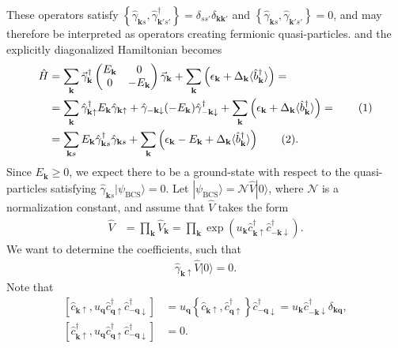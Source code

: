 \documentclass[english, parskip=full]{scrartcl}
\newcommand\numberthis{\addtocounter{equation}{1}\tag{\theequation}}
\newcommand{\kla}{}
\newcommand{\klam}{}
\newcommand{\klammer}{}
\newcommand{\tecxt}{}
\newcommand{\Ket}{}
\begin{document}
These operators satisfy $\klammer\left\{ \hat{\gamma}_{\mathbf{k}s}, \hat{\gamma}_{\mathbf{k}'s'}^\dagger \right\} = \delta_{ss'} \delta_{\mathbf{k}\mathbf{k}'}$ and $\klammer\left\{ \hat{\gamma}_{\mathbf{k}s}, \hat{\gamma}_{\mathbf{k}'s'} \right\} = 0$, and may therefore be interpreted as operators creating fermionic quasi-particles.
and the explicitly diagonalized Hamiltonian becomes
\begin{align}
\hat{H} &= \sum_{\mathbf{k}} \vec{\gamma}_{\mathbf{k}}^\dagger \begin{pmatrix}
E_{\mathbf{k}} & 0 \\ 0 & -E_{\mathbf{k}}
\end{pmatrix} \vec{\gamma}_{\mathbf{k}} + \sum_{\textbf{k}}\kla\left(  \epsilon_\textbf{k} + \Delta_\textbf{k} \langle \hat{b}_{\mathbf{k}}^\dagger \rangle \right) =  \\
&= \sum_{\mathbf{k}} \hat{\gamma}_{\mathbf{k}\uparrow}^\dagger E_{\mathbf{k}} \hat{\gamma}_{\mathbf{k}\uparrow} + \hat{\gamma}_{-\mathbf{k}\downarrow} (-E_{\mathbf{k}}) \hat{\gamma}_{-\mathbf{k}\downarrow}^\dagger + \sum_{\textbf{k}}\kla\left(  \epsilon_\textbf{k} + \Delta_\textbf{k} \langle \hat{b}_{\mathbf{k}}^\dagger \rangle \right) =  \numberthis\\
&= \sum_{\mathbf{k}s} E_{\mathbf{k}} \hat{\gamma}_{\mathbf{k}s}^\dagger \hat{\gamma}_{\mathbf{k}s} + \sum_{\textbf{k}}\kla\left(  \epsilon_\textbf{k} - E_\textbf{k} + \Delta_\textbf{k} \langle \hat{b}_{\mathbf{k}}^\dagger \rangle \right) \numberthis \label{eqn:diagonalized hamiltonian}.
\end{align}
Since $E_{\mathbf{k}} \ge 0$, we expect there to be a ground-state with respect to the quasi-particles satisfying $\hat{\gamma}_{\mathbf{k}s} \Ket | \psi_\tecxt\text{BCS} \rangle = 0$.
Let $\Ket | \psi_\tecxt\text{BCS} \rangle = \mathcal{N}\hat{V}\Ket | 0 \rangle$, where $\mathcal{N}$ is a normalization constant, and assume that $\hat{V}$ takes the form
\begin{align}
\hat{V} &= \prod_{\mathbf{k}} \hat{V}_{\mathbf{k}} = \prod_{\mathbf{k}}  \exp\kla\left( u_{\mathbf{k}}  \hat{c}_{\mathbf{k}\uparrow}^\dagger \hat{c}_{-\mathbf{k}\downarrow}^\dagger \right).
\end{align}
We want to determine the coefficients, such that 
\begin{align}
\hat{\gamma}_{\mathbf{k}\uparrow} \hat{V}\Ket | 0 \rangle = 0.
\end{align}
Note that 
\begin{align}
\klam\left[ \hat{c}_{\mathbf{k}\uparrow}, u_{\mathbf{q}} \hat{c}_{\mathbf{q}\uparrow}^\dagger \hat{c}_{-\mathbf{q}\downarrow}^\dagger \right] &= u_{\mathbf{q}} \klammer\left\{ \hat{c}_{\mathbf{k}\uparrow}, \hat{c}_{\mathbf{q}\uparrow}^\dagger \right\} \hat{c}_{-\mathbf{q}\downarrow}^\dagger = u_{\mathbf{k}} \hat{c}_{-\mathbf{k}\downarrow}^\dagger \delta_{\mathbf{k}\textbf{q}},\\
\klam\left[ \hat{c}_{\mathbf{k}\uparrow}^\dagger, u_{\mathbf{q}} \hat{c}_{\mathbf{q}\uparrow}^\dagger \hat{c}_{-\mathbf{q}\downarrow}^\dagger \right] &= 0.
\end{align}
\end{document}
